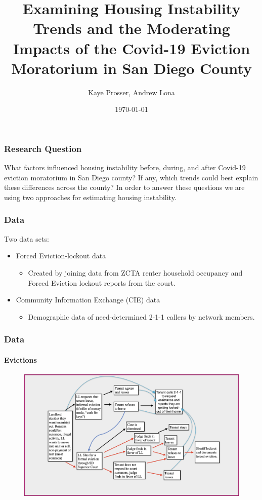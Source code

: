 \documentclass{beamer} %
\title{Examining Housing Instability Trends and the Moderating Impacts of the Covid-19 Eviction Moratorium in San Diego County}
\author{Kaye Prosser, Andrew Lona}
\date{\today}
\begin{document}
  
\begin{frame}
  \titlepage
\end{frame}




\begin{frame}
\frametitle{Research Question}

What factors influenced housing instability before, during, and after Covid-19 eviction moratorium in San Diego county? If any, which trends could best explain these differences across the county? In order to answer these questions we are using two approaches for estimating housing instability. 

\end{frame}



\begin{frame} 
\frametitle{Data}

Two data sets:

\begin{itemize}
	\item Forced Eviction-lockout data
	\begin{itemize}
		\item Created by joining data from ZCTA renter household occupancy and Forced Eviction lockout reports from the court. 
	\end{itemize}
	
	\item Community Information Exchange (CIE) data
	\begin{itemize}
		\item Demographic data of need-determined 2-1-1 callers by network members. 
	\end{itemize}
\end{itemize}
\end{frame}


\begin{frame}
\frametitle{Data}
\framesubtitle{Evictions}

\begin{figure}[H]
  \includegraphics[width=\linewidth]{figures/housing_precarity_tree.png}
  \label{fig:housing_precarity_tree}
\end{figure}

\end{frame}
\end{document}
